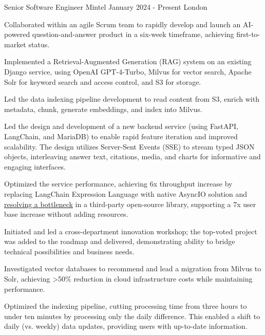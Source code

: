 \documentclass[11pt, a4paper]{awesome-cv}
\begin{document}


\begin{cventries}

  \cventry
    {Senior Software Engineer}
    {Mintel}
    {January 2024 - Present}
    {London}
    {
      \begin{cvitems}
        \item {Collaborated within an agile Scrum team to rapidly develop and launch an AI-powered question-and-answer product in a six-week timeframe, achieving first-to-market status.}
        \item {Implemented a Retrieval-Augmented Generation (RAG) system on an existing Django service, using OpenAI GPT-4-Turbo, Milvus for vector search, Apache Solr for keyword search and access control, and S3 for storage.}
        \item {Led the data indexing pipeline development to read content from S3, enrich with metadata, chunk, generate embeddings, and index into Milvus.}
        \item {Led the design and development of a new backend service (using FastAPI, LangChain, and MariaDB) to enable rapid feature iteration and improved scalability. The design utilizes Server-Sent Events (SSE) to stream typed JSON objects, interleaving answer text, citations, media, and charts for informative and engaging interfaces.}
        \item {Optimized the service performance, achieving 6x throughput increase by replacing LangChain Expression Language with native AsyncIO solution and \href{https://leverstone.me/blog/performance-profiling-in-python-tools-techniques-and-an-unexpected-culprit}{resolving a bottleneck}
         in a third-party open-source library, supporting a 7x user base increase without adding resources.}
        \item {Initiated and led a cross-department innovation workshop; the top-voted project was added to the roadmap and delivered, demonstrating ability to bridge technical possibilities and business needs.}
        \item {Investigated vector databases to recommend and lead a migration from Milvus to Solr, achieving >50\% reduction in cloud infrastructure costs while maintaining performance.}
        \item {Optimized the indexing pipeline, cutting processing time from three hours to under ten minutes by processing only the daily difference. This enabled a shift to daily (vs. weekly) data updates, providing users with up-to-date information.}

\end{cvitems}}
\end{cventries}
\end{document}
